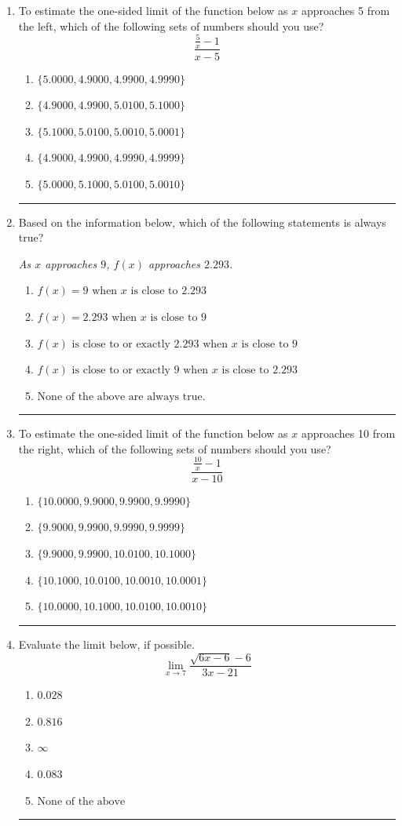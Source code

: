 \documentclass[14pt]{extbook}
\newcommand{\litem}[1]{\item#1\hspace*{-1cm}\rule{\textwidth}{0.4pt}}
\begin{document}
\begin{enumerate}
{\begin{enumerate}[label=\Alph*.]
\end{enumerate} }
\litem{
To estimate the one-sided limit of the function below as $x$ approaches 5 from the left, which of the following sets of numbers should you use?\[ \frac{\frac{5}{x} - 1}{x - 5} \]\begin{enumerate}[label=\Alph*.]
\item \( \{ 5.0000, 4.9000, 4.9900, 4.9990 \} \)
\item \( \{ 4.9000, 4.9900, 5.0100, 5.1000 \} \)
\item \( \{ 5.1000, 5.0100, 5.0010, 5.0001 \} \)
\item \( \{ 4.9000, 4.9900, 4.9990, 4.9999 \} \)
\item \( \{ 5.0000, 5.1000, 5.0100, 5.0010 \} \)

\end{enumerate} }
\litem{
Based on the information below, which of the following statements is always true?
\begin{center}
    \textit{ As $x$ approaches $9$, $f(x)$ approaches $2.293$. }
\end{center}
\begin{enumerate}[label=\Alph*.]
\item \( f(x) = 9 \text{ when } x \text{ is close to } 2.293 \)
\item \( f(x) = 2.293 \text{ when } x \text{ is close to } 9 \)
\item \( f(x) \text{ is close to or exactly } 2.293 \text{ when } x \text{ is close to } 9 \)
\item \( f(x) \text{ is close to or exactly } 9 \text{ when } x \text{ is close to } 2.293 \)
\item \( \text{None of the above are always true.} \)

\end{enumerate} }
\litem{
To estimate the one-sided limit of the function below as $x$ approaches 10 from the right, which of the following sets of numbers should you use?\[ \frac{\frac{10}{x} - 1}{x - 10} \]\begin{enumerate}[label=\Alph*.]
\item \( \{ 10.0000, 9.9000, 9.9900, 9.9990 \} \)
\item \( \{ 9.9000, 9.9900, 9.9990, 9.9999 \} \)
\item \( \{ 9.9000, 9.9900, 10.0100, 10.1000 \} \)
\item \( \{ 10.1000, 10.0100, 10.0010, 10.0001 \} \)
\item \( \{ 10.0000, 10.1000, 10.0100, 10.0010 \} \)

\end{enumerate} }
\litem{
Evaluate the limit below, if possible.\[ \lim_{x \rightarrow 7} \frac{\sqrt{6x - 6} - 6}{3x - 21} \]\begin{enumerate}[label=\Alph*.]
\item \( 0.028 \)
\item \( 0.816 \)
\item \( \infty \)
\item \( 0.083 \)
\item \( \text{None of the above} \)

\end{enumerate} }
\end{enumerate}
\end{document}
